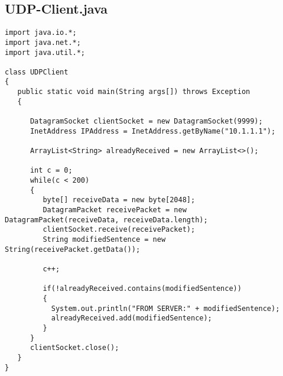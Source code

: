 \documentclass[12pt]{article}
\theoremstyle{plain}
\begin{document}
\subsection{UDP-Client.java}
\begin{lstlisting}
import java.io.*;
import java.net.*;
import java.util.*;

class UDPClient
{
   public static void main(String args[]) throws Exception
   {

      DatagramSocket clientSocket = new DatagramSocket(9999);
      InetAddress IPAddress = InetAddress.getByName("10.1.1.1");
      
      ArrayList<String> alreadyReceived = new ArrayList<>();
      
      int c = 0;
      while(c < 200)
      {
         byte[] receiveData = new byte[2048];
         DatagramPacket receivePacket = new DatagramPacket(receiveData, receiveData.length);
         clientSocket.receive(receivePacket);
         String modifiedSentence = new String(receivePacket.getData());
      
         c++;
         
         if(!alreadyReceived.contains(modifiedSentence))
         {
           System.out.println("FROM SERVER:" + modifiedSentence);
           alreadyReceived.add(modifiedSentence);
         }
      }
      clientSocket.close(); 
   }
}
\end{lstlisting}
\end{document}
